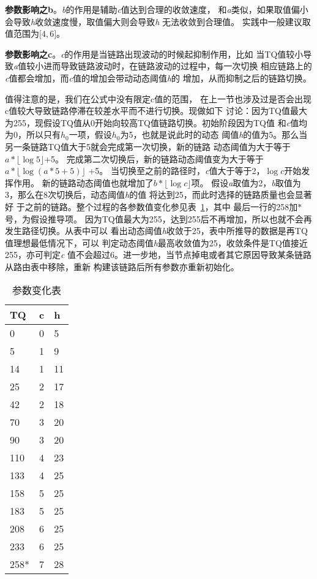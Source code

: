 \textbf{参数影响之b}。\emph{b}的作用是辅助\emph{c}值达到合理的收敛速度，
和\emph{a}类似，如果取值偏小会导致\emph{h}收敛速度慢，取值偏大则会导致\emph{h}
无法收敛到合理值。
实践中一般建议取值范围为$\lbrack4,6\rbrack$。


\textbf{参数影响之c}。\emph{c}的作用是当链路出现波动的时候起抑制作用，比如
当TQ值较小导致\emph{a}值较小进而导致链路波动时，在链路波动的过程中，每一次切换
相应链路上的\emph{c}值都会增加，而\emph{c}值的增加会带动动态阈值\emph{h}的
增加，从而抑制之后的链路切换。

值得注意的是，我们在公式中没有限定c值的范围，
在上一节也涉及过是否会出现c值较大导致链路停滞在较差水平而不进行切换。现做如下
讨论：因为TQ值最大为255，现假设TQ值从0开始向较高TQ值链路切换。初始阶段因为TQ值
和\emph{c}值均为0，所以只有$h_{0}$一项，假设$h_{0}$为5，也就是说此时的动态
阈值\emph{h}的值为5。那么当另一条链路TQ值大于5就会完成第一次切换，新的链路
动态阈值为大于等于$a*\lfloor \log 5 \rfloor$+5。
完成第二次切换后，新的链路动态阈值变为大于等于
$a*\lfloor \log(a*5+5) \rfloor$ +5。
当切换至之前的路径时，\emph{c}值大于等于2，$\log c$开始发挥作用。
新的链路动态阈值也就增加了$b*\lfloor \log c \rfloor$项。
假设\emph{a}取值为2，\emph{b}取值为3，那么在8次切换后，动态阈值\emph{h}的值
将达到25，而此时选择的链路质量也会显著好
于之前的链路。整个过程的各参数值变化参见表~\ref{tab:parameter_change}，其中
最后一行的258加$*$号，为假设推导项。
因为TQ值最大为255，达到255后不再增加，所以也就不会再发生路径切换。从表中可以
看出动态阈值\emph{h}收敛于25，表中所推导的数据是再TQ值理想最低情况下，可以
判定动态阈值\emph{h}最高收敛值为25，收敛条件是TQ值接近255，亦可判定\emph{c}
值不会超过6。进一步地，当节点掉电或者其它原因导致某条链路从路由表中移除，重新
构建该链路后所有参数亦重新初始化。

\begin{table}[htbp]
  \centering
  \caption{参数变化表}
  \label{tab:parameter_change}
  \begin{tabular}{p{2cm}p{2cm}p{2cm}}
  \hline
  TQ & c & h\\
  \hline
  0 & 0 & 5 \\
  5 & 1 & 9 \\
  14 & 1 & 11 \\
  25 & 2 & 17 \\
  42 & 2 & 18 \\
  70 & 3 & 20 \\
  90 & 3 & 20 \\
  110 & 4 & 23 \\
  133 & 4 & 25 \\
  158 & 5 & 25 \\
  183 & 5 & 25 \\
  208 & 6 & 25 \\
  233 & 6 & 25 \\
  258* & 7 & 28 \\
  \hline
  \end{tabular}
\end{table}

